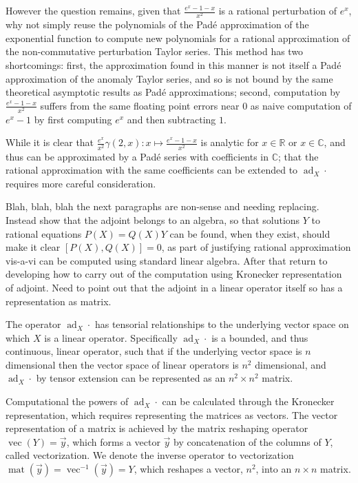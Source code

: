 However the question remains, given that $\frac{e^{x} -1 - x}{x^2}$ is a 
rational perturbation of $e^x$, why not simply reuse the polynomials of the 
Pad\'{e} approximation of the exponential function to compute new polynomials 
for a rational approximation of the non-commutative perturbation Taylor series. 
This method has two shortcomings: first, the approximation found in this manner 
is not itself a Pad\'{e} approximation of the anomaly Taylor series, and so is 
not bound by the same theoretical asymptotic results as Pad\'{e} approximations;
second, computation by $\frac{e^{x} - 1 - x}{x^2}$ suffers from the same 
floating point errors near $0$ as naive computation of $e^x - 1$ by first 
computing $e^x$ and then subtracting $1$.

While it is clear that $\frac{e^x}{x^2}\gamma\left(2,x\right) : x \mapsto \frac{e^{x} -1 - x}{x^2}$ 
is analytic for $x \in \mathbb{R}$ or $x \in \mathbb{C}$, and thus can be 
approximated by a Pad\'{e} series with coefficients in $\mathbb{C}$; that the
rational approximation with the same coefficients can be extended to $\operatorname{ad}_X \cdotp$ 
requires more careful consideration.

Blah, blah, blah the next paragraphs are non-sense and needing replacing. Instead 
show that the adjoint belongs to an algebra, so that solutions $Y$ to rational 
equations $P(X)=Q(X)Y$ can be found, when they exist, should make it clear $[P(X),Q(X)]=0$,
as part of justifying rational approximation vis-a-vi can be computed using 
standard linear algebra. After that return to developing how to carry out of the 
computation using Kronecker representation of adjoint. Need to point out that
the adjoint in a linear operator itself so has a representation as matrix.

The operator $\operatorname{ad}_X \cdotp$ has tensorial relationships to the 
underlying vector space on which $X$ is a linear operator. Specifically $\operatorname{ad}_X \cdotp$
is a bounded, and thus continuous, linear operator, such that if the underlying 
vector space is $n$ dimensional then the vector space of linear operators is 
$n^2$ dimensional, and $\operatorname{ad}_X \cdotp$ by tensor extension can be 
represented as an $n^2 \times n^2$ matrix. 

Computational the powers of $\operatorname{ad}_X \cdotp$ can be calculated 
through the Kronecker representation, which requires representing the matrices 
as vectors. The vector representation of a matrix is achieved by the matrix 
reshaping  operator $\operatorname{vec}\left(Y\right) = \vec{y}$, which forms a 
vector $\vec{y}$ by concatenation of the columns of $Y$, called vectorization. 
We denote the inverse operator to vectorization $\operatorname{mat}\left(\vec{y}\right) = \operatorname{vec}^{-1}\left(\vec{y}\right) = Y$,
which reshapes a vector, $n^2$, into an $n \times n$ matrix.

